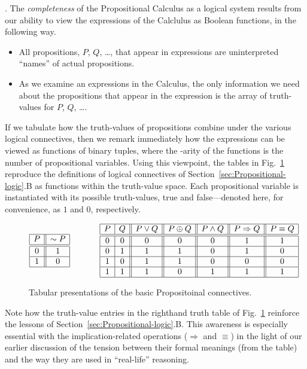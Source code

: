 \bigskip

.
The {\em completeness} of the Propositional Calculus as a logical
system results from our ability to view the expressions of the
Calclulus as Boolean functions, in the following way.
\begin{itemize}
\item
All propositions, $P$, $Q$, \ldots, that appear in expressions are
uninterpreted ``names'' of actual propositions.
\item
As we examine an expressions in the Calculus, the only information we
need about the propositions that appear in the expression is the array
of truth-values for $P$, $Q$, \ldots.
\end{itemize}
If we tabulate how the truth-values of propositions combine under the
various logical connectives, then we remark immediately how the
expressions can be viewed as functions of binary tuples, where the
-arity of the functions is the number of propositional variables.
Using this viewpoint, the tables in Fig.~\ref{fig:defns-via-tables}
reproduce the definitions of logical connectives of
Section~\ref{sec:Propositional-logic}.B as functions within the
truth-value space.  Each propositional variable is instantiated with
its possible truth-values, {\sc true} and {\sc false}---denoted here,
for convenience, as $1$ and $0$, respectively.
\begin{figure}[hbt]
\[
\begin{array}{|c||c|}
\hline
P & \sim P \\
\hline
\hline
0 & 1 \\
\hline
1 & 0 \\
\hline
\end{array}
\hspace*{.5in}
\begin{array}{|c|c||c||c||c||c||c|}
\hline
P & Q & P \vee Q  & P \oplus Q & P \wedge Q & P \Rightarrow Q & P \equiv Q  \\
\hline
\hline
0 & 0 & 0 & 0 & 0 & 1 & 1 \\
\hline
0 & 1 & 1 & 1 & 0 & 1 & 0 \\
\hline
1 & 0 & 1 & 1 & 0 & 0 & 0 \\
\hline
1 & 1 & 1 & 0 & 1 & 1 & 1 \\
\hline
\end{array}
\]
\caption{Tabular presentations of the basic Propositoinal connectives.
\label{fig:defns-via-tables}}
\end{figure}
Note how the truth-value entries in the righthand truth table of
Fig.~\ref{fig:defns-via-tables} reinforce the lessons of
Section~\ref{sec:Propositional-logic}.B.  This awareness is especially
essential with the implication-related operations ($\Rightarrow$ and
$\equiv$) in the light of our earlier discussion of the tension
between their formal meanings (from the table) and the way they are
used in ``real-life'' reasoning.


